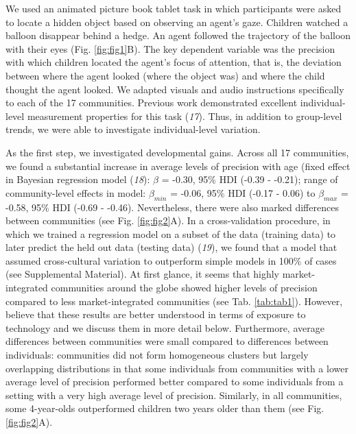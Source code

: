 \documentclass[
  man,floatsintext]{apa6}
\begin{document}
We used an animated picture book tablet task in which participants were asked to locate a hidden object based on observing an agent's gaze. Children watched a balloon disappear behind a hedge. An agent followed the trajectory of the balloon with their eyes (Fig. \ref{fig:fig1}B). The key dependent variable was the precision with which children located the agent's focus of attention, that is, the deviation between where the agent looked (where the object was) and where the child thought the agent looked. We adapted visuals and audio instructions specifically to each of the 17 communities. Previous work demonstrated excellent individual-level measurement properties for this task (\emph{17}). Thus, in addition to group-level trends, we were able to investigate individual-level variation.

As the first step, we investigated developmental gains. Across all 17 communities, we found a substantial increase in average levels of precision with age (fixed effect in Bayesian regression model (\emph{18}): \(\beta\) = -0.30, 95\% HDI (-0.39 - -0.21); range of community-level effects in model: \(\beta_{min}\) = -0.06, 95\% HDI (-0.17 - 0.06) to \(\beta_{max}\) = -0.58, 95\% HDI (-0.69 - -0.46). Nevertheless, there were also marked differences between communities (see Fig. \ref{fig:fig2}A). In a cross-validation procedure, in which we trained a regression model on a subset of the data (training data) to later predict the held out data (testing data) (\emph{19}), we found that a model that assumed cross-cultural variation to outperform simple models in 100\% of cases (see Supplemental Material). At first glance, it seems that highly market-integrated communities around the globe showed higher levels of precision compared to less market-integrated communities (see Tab. \ref{tab:tab1}). However, believe that these results are better understood in terms of exposure to technology and we discuss them in more detail below. Furthermore, average differences between communities were small compared to differences between individuals: communities did not form homogeneous clusters but largely overlapping distributions in that some individuals from communities with a lower average level of precision performed better compared to some individuals from a setting with a very high average level of precision. Similarly, in all communities, some 4-year-olds outperformed children two years older than them (see Fig. \ref{fig:fig2}A).
\end{document}
